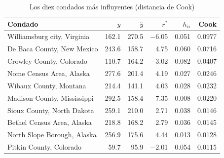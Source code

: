 \begin{table}[htbp]
\centering
\footnotesize
\caption{Los diez condados más influyentes (distancia de Cook)}\label{tab:influyentes}
\begin{tabularx}{\linewidth}{>{\raggedright\arraybackslash}X r r r r r}
\toprule
Condado & $y$ & $\hat y$ & $r^*$ & $h_{ii}$ & Cook \\
\midrule
Williamsburg city, Virginia & \num{162.1} & \num{270.5} & \num{-6.05} & \num{0.051} & \num{0.0977} \\
De Baca County, New Mexico & \num{243.6} & \num{158.7} & \num{4.75} & \num{0.060} & \num{0.0716} \\
Crowley County, Colorado & \num{110.7} & \num{164.2} & \num{-3.02} & \num{0.082} & \num{0.0407} \\
Nome Census Area, Alaska & \num{277.6} & \num{201.4} & \num{4.19} & \num{0.027} & \num{0.0246} \\
Wibaux County, Montana & \num{214.4} & \num{141.1} & \num{4.03} & \num{0.028} & \num{0.0232} \\
Madison County, Mississippi & \num{292.5} & \num{158.4} & \num{7.35} & \num{0.008} & \num{0.0220} \\
Sioux County, North Dakota & \num{259.1} & \num{210.0} & \num{2.71} & \num{0.038} & \num{0.0146} \\
Bethel Census Area, Alaska & \num{218.8} & \num{168.2} & \num{2.79} & \num{0.036} & \num{0.0145} \\
North Slope Borough, Alaska & \num{256.9} & \num{175.6} & \num{4.44} & \num{0.013} & \num{0.0128} \\
Pitkin County, Colorado & \num{59.7} & \num{95.9} & \num{-2.01} & \num{0.054} & \num{0.0115} \\
\bottomrule
\end{tabularx}
\par{}
\end{table}
